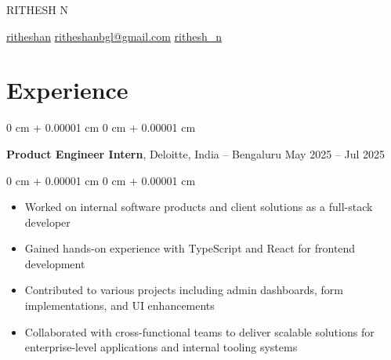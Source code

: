 \documentclass[10pt, letterpaper]{article}
\newenvironment{highlights}{
    \begin{itemize}[
        topsep=0.10 cm,
        parsep=0.10 cm,
        partopsep=0pt,
        itemsep=0pt,
        leftmargin=0 cm + 10pt
    ]
}{
    \end{itemize}
} %
\newenvironment{onecolentry}{
    \begin{adjustwidth}{
        0 cm + 0.00001 cm
    }{
        0 cm + 0.00001 cm
    }
}{
    \end{adjustwidth}
} %
\newenvironment{twocolentry}[2][]{
    \onecolentry
    \def\secondColumn{#2}
    \setcolumnwidth{\fill, 4.5 cm}
    \begin{paracol}{2}
}{
    \switchcolumn \raggedleft \secondColumn
    \end{paracol}
    \endonecolentry
} %
\newenvironment{header}{
    \setlength{\topsep}{0pt}\par\kern\topsep\centering\linespread{1.5}
}{
    \par\kern\topsep
} %
\begin{document}
  \begin{header}
    \fontsize{25 pt}{25 pt}\selectfont RITHESH N

    \vspace{5 pt}

    \normalsize
    \mbox{\raisebox{-0.1\height}\faLinkedin\hspace{2pt}\href{https://www.linkedin.com/in/ritheshan/}{ritheshan}} \hspace{10pt}%
    \mbox{\raisebox{-0.1\height}\faEnvelope\hspace{2pt}\href{mailto:ritheshanbgl@gmail.com}{ritheshanbgl@gmail.com}} \hspace{10pt}%
    \mbox{\hspace{2pt}\href{https://leetcode.com/rithesh_n}{rithesh\_n}}%
\end{header}

    \vspace{5 pt - 0.3 cm}

    \section{Experience}

        \begin{twocolentry}{
            May 2025 – Jul 2025
        }
            \textbf{Product Engineer Intern}, Deloitte, India -- Bengaluru\end{twocolentry}

        \vspace{0.10 cm}
        \begin{onecolentry}
            \begin{highlights}
                \item Worked on internal software products and client solutions as a full-stack developer
                \item Gained hands-on experience with TypeScript and React for frontend development
                \item Contributed to various projects including admin dashboards, form implementations, and UI enhancements
                \item Collaborated with cross-functional teams to deliver scalable solutions for enterprise-level applications and internal tooling systems
            \end{highlights}
        \end{onecolentry}
\end{document}
